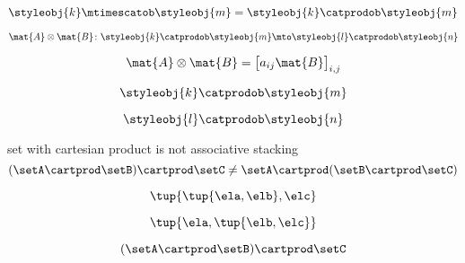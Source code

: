 {\begin{forslides}
        \begin{equation}
            \label{eq:parallelism-039}
            \styleobj{k} \mtimescatob \styleobj{m} = \styleobj{k} \catprodob \styleobj{m}
        \end{equation}

        \begin{equation}
            \label{eq:parallelism-040}
            \mat{A} \otimes \mat{B} \colon \styleobj{k} \catprodob \styleobj{m} \mto \styleobj{l} \catprodob \styleobj{n}
        \end{equation}

        \begin{equation}
            \label{eq:parallelism-041}
            \mat{A} \otimes \mat{B} =
            \begin{bmatrix}
                a_{ij} \mat{B}
            \end{bmatrix}_{i,j}
        \end{equation}

        \begin{equation}
            \label{eq:parallelism-042}
            \styleobj{k} \catprodob \styleobj{m}
        \end{equation}

        \begin{equation}
            \label{eq:parallelism-043}
            \styleobj{l} \catprodob \styleobj{n}
        \end{equation}

        set with cartesian product is not associative stacking
        \begin{equation}
            \label{eq:parallelism-044}
            (\setA \cartprod \setB) \cartprod \setC \neq \setA \cartprod (\setB \cartprod \setC)
        \end{equation}

        \begin{equation}
            \label{eq:parallelism-045}
            \tup{\tup{\ela, \elb}, \elc}
        \end{equation}

        \begin{equation}
            \label{eq:parallelism-046}
            \tup{\ela, \tup{\elb, \elc}}
        \end{equation}

        \begin{equation}
            \label{eq:parallelism-047}
            (\setA \cartprod \setB) \cartprod \setC
        \end{equation}


\end{forslides}}
